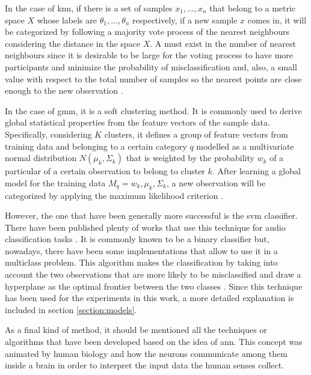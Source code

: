 	In the case of \acrfull{knn}, if there is a set of samples ${x_1, ..., x_n}$ that belong to a metric space $X$ whose labels are ${\theta_1, ..., \theta_n}$ respectively, if a new sample $x$ comes in, it will be categorized by following a majority vote process of the nearest neighbours considering the distance in the space $X$. A  must exist in the number of nearest neighbours since it is desirable to be large for the voting process to have more participants and minimize the probability of misclassification and, also, a small value with respect to the total number of samples so the nearest points are close enough to the new observation \cite{Cover1967}. 
	
	In the case of \acrfull{gmm}, it is a soft clustering method. It is commonly used to derive global statistical properties from the feature vectors of the sample data. Specifically, considering $K$ clusters, it defines a group of feature vectors from training data and belonging to a certain category $q$ modelled as a multivariate normal distribution $N(\mu_k, \Sigma_k)$ that is weighted by the probability $w_k$ of a particular of a certain observation to belong to cluster $k$. After learning a global model for the training data $M_q={w_k, \mu_k, \Sigma_k}$, a new observation will be categorized by applying the maximum likelihood criterion \cite{Stowell2015}.
	
	However, the one that have been generally more successful is the \acrfull{svm} classifier. There have been published plenty of works that use this technique for audio classification tasks \cite{Jiang2005} \cite{Geiger2013} \cite{Barchiesi2015}. It is commonly known to be a binary classifier but, nowadays, there have been some implementations that allow to use it in a multiclass problem. This algorithm makes the classification by taking into account the two observations that are more likely to be misclassified and draw a hyperplane as the optimal frontier between the two classes \cite{Fu2011}. Since this technique has been used for the experiments in this work, a more detailed explanation is included in section \ref{section:models}.
	
	As a final kind of method, it should be mentioned all the techniques or algorithms that have been developed based on the idea of \acrfull{ann}. This concept was animated by human biology and how the neurons communicate among them inside a brain in order to interpret the input data the human senses collect. 
	
